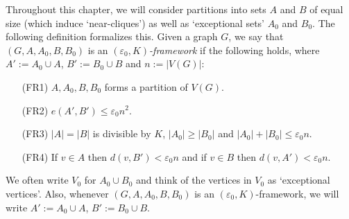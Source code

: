 \documentclass{memo-l}
\def\COMMENT#1{}
\def\eps{\varepsilon}
\def\epszero{\eps_0}
\numberwithin{section}{chapter}
\numberwithin{equation}{section}
\numberwithin{firstthm}{section}
\numberwithin{figure}{section}
\begin{document}
Throughout this chapter, we will consider partitions into sets $A$ and $B$ of equal size (which induce `near-cliques')
as well as `exceptional sets' $A_0$ and $B_0$. The following definition formalizes this.
Given a graph $G$, we say that $(G,A,A_0,B,B_0)$ is an \emph{$(\epszero,K)$-framework} if the following holds,
where $A':=A_0\cup A$, $B':=B_0\cup B$ and $n:=|V(G)|$: 
\begin{itemize}
\item[{\rm (FR1)}] $A,A_0,B,B_0$ forms a partition of $V(G)$. 
\item[{\rm (FR2)}] $e(A',B')\le \epszero n^2$.
\item[{\rm (FR3)}] $|A|=|B|$ is divisible by $K$, $|A_0| \ge |B_0|$ and $|A_0| + |B_0| \le \epszero n$.
\item[{\rm (FR4)}] If $v\in A$ then $d(v, B')< \epszero n$ and if $v\in B$ then $d(v, A')< \epszero n$.\COMMENT{Deryk}
\end{itemize}
We often write $V_0$ for $A_0\cup B_0$ and think of the vertices in $V_0$ as `exceptional vertices'.
Also, whenever $(G,A,A_0,B,B_0)$ is an $(\epszero,K)$-framework, we will write $A':=A_0\cup A$, $B':=B_0\cup B$.
\end{document}
